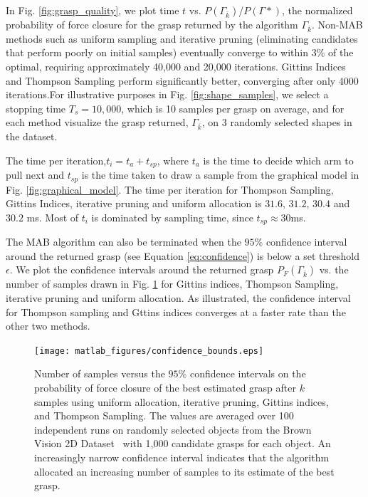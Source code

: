 \documentclass[10pt, conference]{ieeeconf}      %
\begin{document}
In Fig. \ref{fig:grasp_quality}, we plot time $t$ vs. $P(\Gamma_{\bar{k}})$/$P(\Gamma*)$, the normalized probability of force closure for the grasp returned by the algorithm $\Gamma_{\bar{k}}$.  Non-MAB methods such as uniform sampling and iterative pruning (eliminating candidates that perform poorly on initial samples) eventually converge to within 3$\%$ of the optimal, requiring approximately 40,000 and 20,000 iterations.  Gittins Indices and Thompson Sampling  perform significantly better, converging after only 4000 iterations.For illustrative purposes in Fig. \ref{fig:shape_samples}, we select a stopping time $T_s=10,000$, which is 10 samples per grasp on average, and for each method visualize the grasp  returned, $\Gamma_{\bar{k}}$, on 3 randomly selected shapes in the dataset.

The time per iteration,$t_{i} = t_{a}+t_{sp}$, where $t_{a}$ is the time to decide which arm to pull next and $t_{sp}$ is the time taken to draw a sample from the graphical model in Fig. \ref{fig:graphical_model}. The time per iteration for Thompson Sampling, Gittins Indices, iterative pruning and uniform allocation is $31.6$, $31.2$, $30.4$ and $30.2$ ms. Most of $t_{i}$ is dominated by sampling time, since $t_{sp} \approx 30$ms.

The MAB algorithm can also be terminated when the $95\%$ confidence interval around the returned grasp (see Equation \ref{eq:confidence}) is below a set threshold $\epsilon$. We plot the confidence intervals around the returned grasp $P_F(\Gamma_{\bar{k}})$ vs. the number of samples drawn in Fig. \ref{fig:confidence} for Gittins indices, Thompson Sampling, iterative pruning\cite{kehoe2012toward} and uniform allocation.  As illustrated, the confidence interval for Thompson sampling and Gttins indices converges at a faster rate than the other two methods. 


\begin{figure}[t!]
\centering
\texttt{[image: matlab\_figures/confidence\_bounds.eps]}
\caption{ Number of samples versus the $95\%$ confidence intervals on the probability of force closure of the best estimated grasp after $k$ samples using uniform allocation, iterative pruning, Gittins indices, and Thompson Sampling. The values are averaged over 100 independent runs on randomly selected objects from the Brown Vision 2D Dataset~\cite{brown} with 1,000 candidate grasps for each object. An increasingly narrow confidence interval indicates that the algorithm allocated an increasing number of samples to its estimate of the best grasp. }

\vspace*{-10pt}
\label{fig:confidence}
\end{figure}
\end{document}

